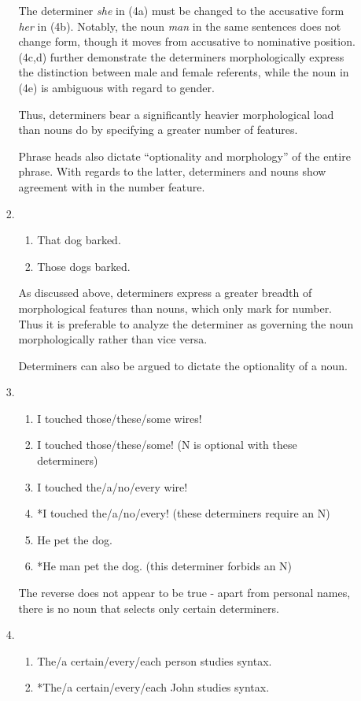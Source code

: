 \documentclass[12pt]{article}
\begin{document}
\begin{enumerate}
\begin{enumerate}
\begin{enumerate}[label=(\arabic*)]
The determiner \emph{she} in (4a) must be changed to the accusative form \emph{her} in (4b). Notably, the noun \emph{man} in the same sentences does not change form, though it moves from accusative to nominative position. (4c,d) further demonstrate the determiners morphologically express the distinction between male and female referents, while the noun in (4e) is ambiguous with regard to gender.

Thus, determiners bear a significantly heavier morphological load than nouns do by specifying a greater number of features.

Phrase heads also dictate ``optionality and morphology'' of the entire phrase. With regards to the latter, determiners and nouns show agreement with in the number feature.
\item
\begin{enumerate}[label=\alph*.]
\item That dog barked.
\item Those dogs barked.
\end{enumerate}

As discussed above, determiners express a greater breadth of morphological features than nouns, which only mark for number. Thus it is preferable to analyze the determiner as governing the noun morphologically rather than vice versa.

Determiners can also be argued to dictate the optionality of a noun.
\item
\begin{enumerate}[label=\alph*.]
\item I touched those/these/some wires!
\item I touched those/these/some! (N is optional with these determiners)
\item I touched the/a/no/every wire!
\item *I touched the/a/no/every! (these determiners require an N)
\item He pet the dog.
\item *He man pet the dog. (this determiner forbids an N)
\end{enumerate}

The reverse does not appear to be true - apart from personal names, there is no noun that selects only certain determiners.
\item
\begin{enumerate}[label=\alph*.]
\item The/a certain/every/each person studies syntax.
\item *The/a certain/every/each John studies syntax.
\end{enumerate}


\end{enumerate}
\end{enumerate}
\end{enumerate}
\end{document}
